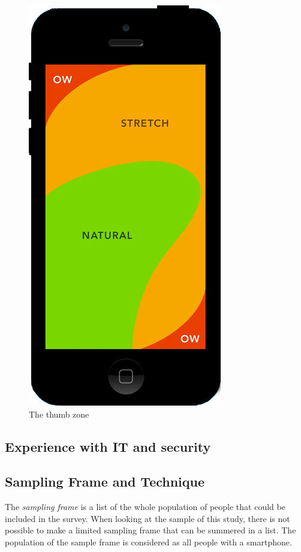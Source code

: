       \begin{figure}[H]
          \centering
          \includegraphics[scale=0.20]{pics/review/mobileScreen.jpg}
          \caption{The thumb zone}
          \label{fig:thumbZone}
        \end{figure}

      \subsection*{Experience with IT and security}


	\subsection{Sampling Frame and Technique} \label{sec:sampling}
      
    The {\it sampling frame} is a list of the whole population of people that could be included in the survey. When looking at the sample of this study, there is not possible to make a limited sampling frame that can be summered in a list. The population of the sample frame is considered as all people with a smartphone.

